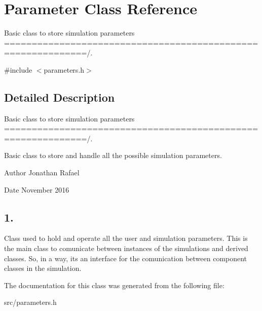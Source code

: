 \hypertarget{class_parameter}{}\section{Parameter Class Reference}
\label{class_parameter}


Basic class to store simulation parameters =============================================================/.  




{\ttfamily \#include $<$parameters.\+h$>$}



\subsection{Detailed Description}
Basic class to store simulation parameters =============================================================/. 

Basic class to store and handle all the possible simulation parameters. \begin{DoxyAuthor}{Author}
Jonathan Rafael 
\end{DoxyAuthor}
\begin{DoxyDate}{Date}
November 2016 \subsection*{1. }
\end{DoxyDate}


Class used to hold and operate all the user and simulation parameters. This is the main class to comunicate between instances of the simulations and derived classes. So, in a way, it\textquotesingle{}s an interface for the comunication between component classes in the simulation. 

The documentation for this class was generated from the following file\+:\begin{DoxyCompactItemize}
\item 
src/parameters.\+h\end{DoxyCompactItemize}
